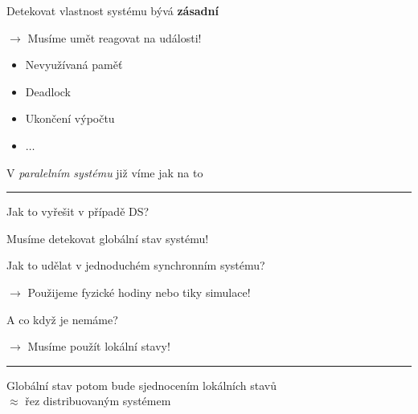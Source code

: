 \documentclass[usenames,dvipsnames,9pt]{beamer}
\begin{document}
\begin{frame}
Detekovat vlastnost systému bývá {\bf zásadní}

\hfill $\rightarrow$ Musíme umět reagovat na události!

\vspace{2em}
\begin{itemize}
\item Nevyužívaná paměť
\item Deadlock
\item Ukončení výpočtu
\item $\dots$
\end{itemize}

\vspace{2em}

V \emph{paralelním systému} již víme jak na to


 \pause\vspace{2em}\hrule\vspace{2em}

  \begin{center}
    \LARGE Jak to vyřešit v případě DS?
  \end{center}
\end{frame}

\begin{frame}
  \begin{center}
    \LARGE Musíme detekovat globální stav systému!
  \end{center}

  \vspace{2em}

  Jak to udělat v jednoduchém synchronním systému?

  \pause\hfill $\rightarrow$ Použijeme fyzické hodiny nebo tiky simulace!

A co když je nemáme?

    \pause\hfill $\rightarrow$ Musíme použít lokální stavy!

      \vspace{2em}\hrule\vspace{2em}

      \begin{center}
    \LARGE Globální stav potom bude sjednocením lokálních stavů\\ $\approx$  řez distribuovaným systémem
  \end{center}

\end{frame}
\end{document}
